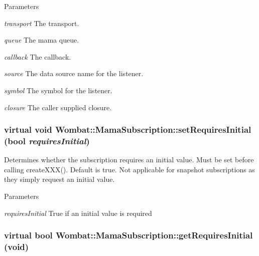 \begin{DoxyParams}{Parameters}
\item[{\em transport}]The transport. \item[{\em queue}]The mama queue. \item[{\em callback}]The callback. \item[{\em source}]The data source name for the listener. \item[{\em symbol}]The symbol for the listener. \item[{\em closure}]The caller supplied closure. \end{DoxyParams}
\hypertarget{classWombat_1_1MamaSubscription_a5402b6243c4bf741d683fae088e8447b}{
\subsubsection[{setRequiresInitial}]{\setlength{\rightskip}{0pt plus 5cm}virtual void Wombat::MamaSubscription::setRequiresInitial (bool {\em requiresInitial})}}
\label{classWombat_1_1MamaSubscription_a5402b6243c4bf741d683fae088e8447b}


Determines whether the subscription requires an initial value. Must be set before calling createXXX(). Default is true. Not applicable for snapshot subscriptions as they simply request an initial value.


\begin{DoxyParams}{Parameters}
\item[{\em requiresInitial}]True if an initial value is required \end{DoxyParams}
\hypertarget{classWombat_1_1MamaSubscription_adc672602e7ac6ecff5ac6709ebfa1d08}{
\subsubsection[{getRequiresInitial}]{\setlength{\rightskip}{0pt plus 5cm}virtual bool Wombat::MamaSubscription::getRequiresInitial (void)}}
\label{classWombat_1_1MamaSubscription_adc672602e7ac6ecff5ac6709ebfa1d08}


